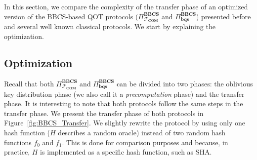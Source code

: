 In this section, we compare the complexity of the transfer phase of an optimized version of the BBCS-based QOT protocols ($\Pi^{\textbf{BBCS}}_{\mathcal{F}_{\textbf{COM}}}$ and $\Pi^{\textbf{BBCS}}_{\textbf{bqs}}$) presented before and several well known classical protocols. We start by explaining the optimization.

\subsection{Optimization}\label{O-OT}

Recall that both $\Pi^{\textbf{BBCS}}_{\mathcal{F}_{\textbf{COM}}}$ and $\Pi^{\textbf{BBCS}}_{\textbf{bqs}}$ can be divided into two phases: the oblivious key distribution phase (we also call it a \textit{precomputation} phase) and the transfer phase. It is interesting to note that both protocols follow the same steps in the transfer phase. We present the transfer phase of both protocols in Figure~\ref{fig:BBCS_Transfer}. We slightly rewrite the protocol by using only one hash function ($H$ describes a random oracle) instead of two random hash functions $f_0$ and $f_1$. This is done for comparison purposes and because, in practice, $H$ is implemented as a specific hash function, such as SHA.

